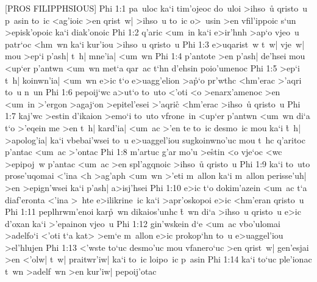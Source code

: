 [PROS FILIPPHSIOUS]
\vs Phi 1:1
pa~uloc
ka`i
tim'ojeoc
do~uloi
>ihso~u\r{}
qristo~u
p~asin
to~ic
<ag'ioic
>en
qrist~w|
>ihso~u
to~ic
o>~usin
>en
vfil'ippoic
s`un
>episk'opoic
ka`i
diak'onoic\bibvsend
\vs Phi 1:2
q'aric
<um~in
ka`i
e>ir'hnh
>ap`o
vjeo~u
patr`oc
<hm~wn
ka`i
kur'iou
>ihso~u
qristo~u\bibvsend
\vs Phi 1:3
e>uqarist~w
t~w|
vje~w|
mou
>ep`i
p'ash|
t~h|
mne'ia|
<um~wn\bibvsend
\vs Phi 1:4
p'antote
>en
p'ash|
de'hsei
mou
<up`er
p'antwn
<um~wn
met`a
qar~ac
t`hn
d'ehsin
poio'umenoc\bibvsend
\vs Phi 1:5
>ep`i
t~h|
koinwn'ia|
<um~wn
e>ic
t`o
e>uagg'elion
>a\r{p}`o
pr'wthc
<hm'erac
>'aqri
to~u
n~un\bibvsend
\vs Phi 1:6
pepoij`wc
a>ut`o
to~uto
<'oti
<o
>enarx'amenoc
>en
<um~in
>'ergon
>agaj`on
>epitel'esei
>'aqri\r{c}
<hm'erac
>ihso~u\r{}
qristo~u\bibvsend
\vs Phi 1:7
kaj'wc
>estin
d'ikaion
>emo`i
to~uto
vfrone~in
<up`er
p'antwn
<um~wn
di`a
t`o
>'eqein
me
>en
t~h|
kard'ia|
<um~ac
>'en
te
to~ic
desmo~ic
mou
ka`i
\r{t}~h|
>apolog'ia|
ka`i
vbebai'wsei
to~u
e>uaggel'iou
sugkoinwno'uc
mou
t~hc
q'aritoc
p'antac
<um~ac
>'ontac\bibvsend
\vs Phi 1:8
m'artuc
g'ar
mo'u
>e\r{s}tin
<o
vje`oc
<wc
>epipoj~w
p'antac
<um~ac
>en
spl'agqnoic
>ihso~u\r{}
qristo~u\bibvsend
\vs Phi 1:9
ka`i
to~uto
prose'uqomai
<'ina
<h
>ag'aph
<um~wn
>'eti
m~allon
ka`i
m~allon
perisse'uh|
>en
>epign'wsei
ka`i
p'ash|
a>isj'hsei\bibvsend
\vs Phi 1:10
e>ic
t`o
dokim'azein
<um~ac
t`a
diaf'eronta
<'ina
>~hte
e>ilikrine~ic
ka`i
>apr'oskopoi
e>ic
<hm'eran
qristo~u\bibvsend
\vs Phi 1:11
peplhrwm'enoi
kar\r{p}~wn
dikaios'unhc
\r{t}~wn
di`a
>ihso~u
qristo~u
e>ic
d'oxan
ka`i
>'epainon
vjeo~u\bibvsend
\vs Phi 1:12
gin'wskein
d`e
<um~ac
vbo'ulomai
>adelfo`i
<'oti
t`a
kat>
>em`e
m~allon
e>ic
prokop`hn
to~u
e>uaggel'iou
>el'hlujen\bibvsend
\vs Phi 1:13
<'wste
to`uc
desmo'uc
mou
vfanero`uc
>en
qrist~w|
gen'esjai
>en
<'olw|
t~w|
praitwr'iw|
ka`i
to~ic
loipo~ic
p~asin\bibvsend
\vs Phi 1:14
ka`i
to`uc
ple'ionac
t~wn
>adelf~wn
>en
kur'iw|
pepoij'otac
